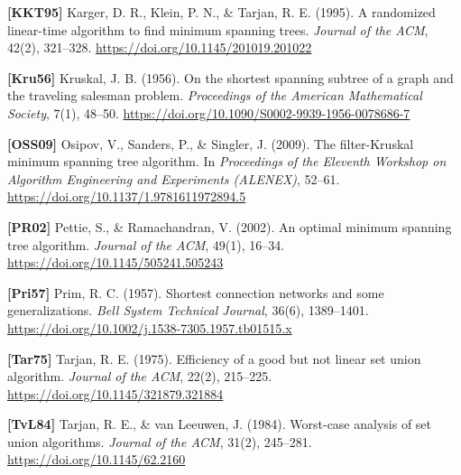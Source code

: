 \documentclass[11pt]{article}
\theoremstyle{plain}
\theoremstyle{remark}
\begin{document}
\noindent \textbf{{[}KKT95{]}} Karger, D. R., Klein, P. N., \& Tarjan, R. E.
(1995). A randomized linear-time algorithm to find minimum spanning
trees. \emph{Journal of the ACM}, 42(2), 321--328.
\url{https://doi.org/10.1145/201019.201022}
\smallskip


\noindent \textbf{{[}Kru56{]}} Kruskal, J. B. (1956). On the shortest spanning
subtree of a graph and the traveling salesman problem. \emph{Proceedings
of the American Mathematical Society}, 7(1), 48--50.
\url{https://doi.org/10.1090/S0002-9939-1956-0078686-7}
\smallskip


\noindent \textbf{{[}OSS09{]}} Osipov, V., Sanders, P., \& Singler, J.
(2009). The filter-Kruskal minimum spanning tree algorithm. In
\emph{Proceedings of the Eleventh Workshop on Algorithm Engineering and
Experiments (ALENEX)}, 52--61.
\url{https://doi.org/10.1137/1.9781611972894.5}
\smallskip


\noindent \textbf{{[}PR02{]}} Pettie, S., \& Ramachandran, V. (2002). An optimal
minimum spanning tree algorithm. \emph{Journal of the ACM}, 49(1),
16--34. \url{https://doi.org/10.1145/505241.505243}
\smallskip


\noindent \textbf{{[}Pri57{]}} Prim, R. C. (1957). Shortest connection networks
and some generalizations. \emph{Bell System Technical Journal}, 36(6),
1389--1401. \url{https://doi.org/10.1002/j.1538-7305.1957.tb01515.x}
\smallskip


\noindent \textbf{{[}Tar75{]}} Tarjan, R. E. (1975). Efficiency of a good but not
linear set union algorithm. \emph{Journal of the ACM}, 22(2), 215--225.
\url{https://doi.org/10.1145/321879.321884}
\smallskip


\noindent \textbf{{[}TvL84{]}} Tarjan, R. E., \& van Leeuwen, J. (1984).
Worst-case analysis of set union algorithms. \emph{Journal of the ACM},
31(2), 245--281. \url{https://doi.org/10.1145/62.2160}
\smallskip
\end{document}
